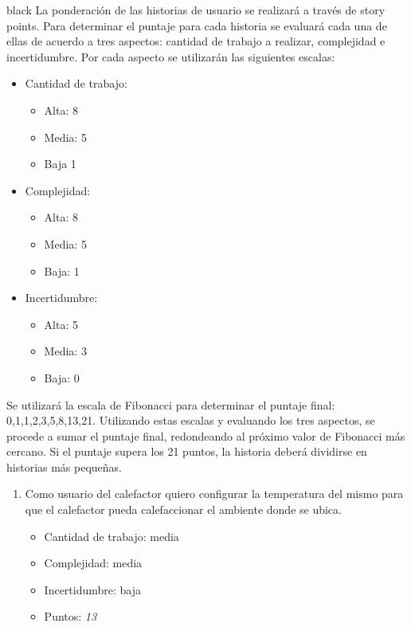 \documentclass[
11pt, %
codirector, %
]{charter}
\begin{document}
\begin{consigna}{black}
La ponderación de las historias de usuario se realizará a través de story
points. Para determinar el puntaje para cada historia se evaluará cada una de ellas de acuerdo a tres aspectos: cantidad de trabajo a realizar, complejidad e incertidumbre. Por cada aspecto se utilizarán las siguientes escalas:
	\begin{itemize}
	\item Cantidad de trabajo:
		\begin{itemize}
		\item Alta: 8
		\item Media: 5
		\item Baja 1
		\end{itemize}
	\item Complejidad:
		\begin{itemize}
		\item Alta: 8
		\item Media: 5
		\item Baja: 1
		\end{itemize}
	\item Incertidumbre:
		\begin{itemize}
		\item Alta: 5
		\item Media: 3
		\item Baja: 0
		\end{itemize}
	\end{itemize}

Se utilizará la escala de Fibonacci para determinar el puntaje final: {0,1,1,2,3,5,8,13,21}. 
Utilizando estas escalas y evaluando los tres aspectos, se procede a sumar el puntaje final, redondeando al próximo valor de Fibonacci más cercano. Si el puntaje supera los 21 puntos, la historia deberá dividirse en historias más pequeñas.
\begin{enumerate}
	\item Como usuario del calefactor quiero  configurar la temperatura del mismo para que el calefactor pueda calefaccionar el ambiente donde se ubica.
		\begin{itemize}
		\item Cantidad de trabajo: media
		\item Complejidad: media
		\item Incertidumbre: baja
		\item Puntos: \textit{13}
		\end{itemize}
		

\end{enumerate}
\end{consigna}
\end{document}
